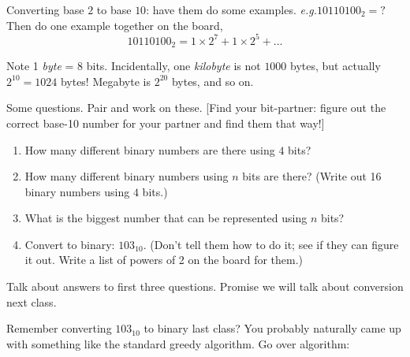 \documentclass{article}
\newcommand{\eg}{\emph{e.g.}\xspace}
\newcommand{\notready}{\textcolor{red}{\XSolidBold}\xspace}
\newcommand{\shortdayname}{%
  \ifthenelse{\equal{\datedayname}{Thursday}}{Th}{\StrLeft{\datedayname}{1}}}
\newcommand{\shortmonthname}{\StrLeft{\datemonthname}{3}}
\newcommand{\showdate}{\thedateday\ \shortmonthname}
\newcommand{\showdowdate}{\shortdayname\ \showdate}
\newcommand{\advanceMWF}{
  \ifthenelse{\equal{\datedayname}{Monday}}
  {\nextdate\nextdate}
  {\ifthenelse{\equal{\datedayname}{Wednesday}}
    {\nextdate\nextdate}
    {\ifthenelse{\equal{\datedayname}{Thursday}}
      {\nextdate}
      {\nextdate\nextdate\nextdate}}}}
\newcommand{\firstclass}[1]{\section*{#1 (\showdowdate)}}
\newcommand{\class}[1]{\advanceMWF\firstclass{#1}}
\begin{document}
Converting base $2$ to base $10$: have them do some
examples. \eg $10110100_2 = ?$  Then do one example together on the
board, \[ 10110100_2 = 1 \times 2^7 + 1 \times 2^5 + \dots \]

Note 1 \emph{byte} = 8 bits.  Incidentally, one \emph{kilobyte} is not
$1000$ bytes, but actually $2^{10} = 1024$ bytes!  Megabyte is
$2^{20}$ bytes, and so on.

Some questions.  Pair and work on these. [Find your bit-partner:
figure out the correct base-10 number for your partner and find them
that way!]

\begin{enumerate}
\item How many different binary numbers are there using $4$ bits?
\item How many different binary numbers using $n$ bits are there?
  (Write out 16 binary numbers using $4$ bits.)
\item What is the biggest number that can be represented using $n$
  bits?
\item Convert to binary: $103_{10}$. (Don't tell them how to do it;
  see if they can figure it out.  Write a list of powers of 2 on the
  board for them.)
\end{enumerate}

Talk about answers to first three questions.  Promise we will talk
about conversion next class.



Remember converting $103_{10}$ to binary last class?  You probably
naturally came up with something like the standard greedy algorithm.
Go over algorithm:
\end{document}
